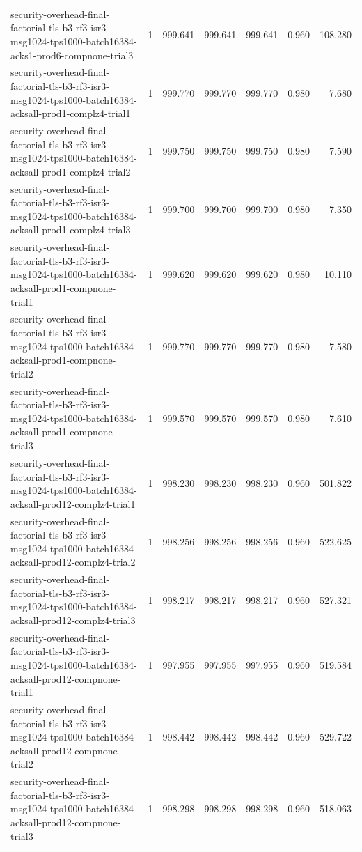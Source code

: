 \begin{tabular}{lrrrrrr}
security-overhead-final-factorial-tls-b3-rf3-isr3-msg1024-tps1000-batch16384-acks1-prod6-compnone-trial3 & 1 & 999.641 & 999.641 & 999.641 & 0.960 & 108.280 \\
security-overhead-final-factorial-tls-b3-rf3-isr3-msg1024-tps1000-batch16384-acksall-prod1-complz4-trial1 & 1 & 999.770 & 999.770 & 999.770 & 0.980 & 7.680 \\
security-overhead-final-factorial-tls-b3-rf3-isr3-msg1024-tps1000-batch16384-acksall-prod1-complz4-trial2 & 1 & 999.750 & 999.750 & 999.750 & 0.980 & 7.590 \\
security-overhead-final-factorial-tls-b3-rf3-isr3-msg1024-tps1000-batch16384-acksall-prod1-complz4-trial3 & 1 & 999.700 & 999.700 & 999.700 & 0.980 & 7.350 \\
security-overhead-final-factorial-tls-b3-rf3-isr3-msg1024-tps1000-batch16384-acksall-prod1-compnone-trial1 & 1 & 999.620 & 999.620 & 999.620 & 0.980 & 10.110 \\
security-overhead-final-factorial-tls-b3-rf3-isr3-msg1024-tps1000-batch16384-acksall-prod1-compnone-trial2 & 1 & 999.770 & 999.770 & 999.770 & 0.980 & 7.580 \\
security-overhead-final-factorial-tls-b3-rf3-isr3-msg1024-tps1000-batch16384-acksall-prod1-compnone-trial3 & 1 & 999.570 & 999.570 & 999.570 & 0.980 & 7.610 \\
security-overhead-final-factorial-tls-b3-rf3-isr3-msg1024-tps1000-batch16384-acksall-prod12-complz4-trial1 & 1 & 998.230 & 998.230 & 998.230 & 0.960 & 501.822 \\
security-overhead-final-factorial-tls-b3-rf3-isr3-msg1024-tps1000-batch16384-acksall-prod12-complz4-trial2 & 1 & 998.256 & 998.256 & 998.256 & 0.960 & 522.625 \\
security-overhead-final-factorial-tls-b3-rf3-isr3-msg1024-tps1000-batch16384-acksall-prod12-complz4-trial3 & 1 & 998.217 & 998.217 & 998.217 & 0.960 & 527.321 \\
security-overhead-final-factorial-tls-b3-rf3-isr3-msg1024-tps1000-batch16384-acksall-prod12-compnone-trial1 & 1 & 997.955 & 997.955 & 997.955 & 0.960 & 519.584 \\
security-overhead-final-factorial-tls-b3-rf3-isr3-msg1024-tps1000-batch16384-acksall-prod12-compnone-trial2 & 1 & 998.442 & 998.442 & 998.442 & 0.960 & 529.722 \\
security-overhead-final-factorial-tls-b3-rf3-isr3-msg1024-tps1000-batch16384-acksall-prod12-compnone-trial3 & 1 & 998.298 & 998.298 & 998.298 & 0.960 & 518.063 \\

\end{tabular}

